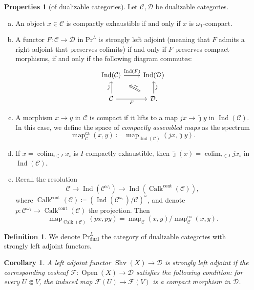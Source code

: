 \documentclass[draft]{amsart}
\newcommand{\jhat}{\hat\jmath}
\newcommand{\cat}[1]{\mathcal{#1}}
\newcommand{\sheaf}[1]{\mathcal{#1}}
\newcommand{\ssubset}{\Subset}
\renewcommand{\Pr}{\mathrm{Pr}}
\DeclareMathOperator{\Ind}{Ind}
\DeclareMathOperator{\Open}{Open}
\DeclareMathOperator{\map}{map}
\DeclareMathOperator{\Shv}{Shv}
\DeclareMathOperator{\Calk}{Calk}
\DeclareMathOperator*{\colim}{colim}
\newtheorem{cor}[thm]{Corollary}
\theoremstyle{definition}
\newtheorem{defn}[thm]{Definition}
\newtheorem{properties}[thm]{Properties}
\begin{document}
\begin{properties}[of dualizable categories]
Let $\cat C, \cat D$ be dualizable categories.
\begin{enumerate}[(a)]
\item An object $x\in \cat C$ is compactly exhaustible if and only if $x$ is $\omega_1$-compact.

\item A functor $F\colon \cat C\to \cat D$ in $\Pr^L$ is strongly left adjoint (meaning that $F$ admits a right adjoint that preserves colimits) if and only if $F$ preserves compact morphisms, if and only if the following diagram commutes:
\[
\begin{tikzcd}
\Ind(\cat C) \ar[r,"\Ind(F)"] & \Ind(\cat D) \\
\cat C \ar[u,"\jhat"] \ar[r,"F"'] & \cat D \ar[ul,Rightarrow,shorten=4mm, sloped, "\sim"] \ar[u,"\jhat"'].
\end{tikzcd}
\]

\item A morphism $x\to y$ in $\cat C$ is compact if it lifts to a map $jx \to \jhat y$ in $\Ind(\cat C)$. In this case, we define the space of \emph{compactly assembled maps} as the spectrum
\[
\map_{\cat C}^{\mathrm{ca}}(x,y)\coloneqq \map_{\Ind(\cat C)}(jx, \jhat y).
\]

\item If $x = \colim_{i\in I} x_i$ is $I$-compactly exhaustible, then $\jhat(x) = \colim_{i\in I} jx_i$ in $\Ind(\cat C)$.

\item Recall the resolution 
\[
\cat C \to \Ind(\cat C^{\omega_1}) \to \Ind(\Calk^{\mathrm{cont}}(\cat C)),
\]
where $\Calk^{\mathrm{cont}}(\cat C) \coloneqq (\Ind(\cat C^{\omega_1})/\cat C)^{\omega}$, 
and denote $p\colon \cat C^{\omega_1} \to \Calk^{\mathrm{cont}}(\cat C)$ the projection. Then
\[
\map_{\Calk(\cat C)}(px, py) = \map_{\cat C}(x,y) / \map_{\cat C}^{\mathrm{ca}} (x,y).
\]
\end{enumerate}
\end{properties}

\begin{defn}
We denote $\Pr^L_{\mathrm{dual}}$ the category of dualizable categories with strongly left adjoint functors.
\end{defn}

\begin{cor}
A left adjoint functor $\Shv(X) \to \cat D$ is strongly left adjoint if the corresponding cosheaf $\sheaf F\colon \Open(X) \to \cat D$ satisfies the following condition: for every $U\ssubset V$, the induced map $\sheaf F(U) \to \sheaf F(V)$ is a compact morphism in $\cat D$.
\end{cor}
\end{document}
